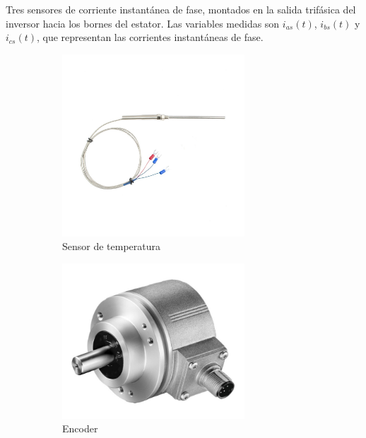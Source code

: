\documentclass{article}
\begin{document}
  
Tres sensores de corriente instantánea de fase, montados en la salida trifásica del inversor hacia los 
bornes del estator. Las variables medidas son $i_{as}(t)$, $i_{bs}(t)$ y $i_{cs}(t)$, que representan las corrientes 
instantáneas de fase.

\begin{figure}[ht]
    \centering
    \begin{subfigure}[b]{0.3\textwidth}
      \centering
      \includegraphics[width=0.75\textwidth]{Alan6.jpg}
      \caption{Sensor de temperatura}
    \end{subfigure}
    \begin{subfigure}[b]{0.3\textwidth}
      \centering
      \includegraphics[width=0.75\textwidth]{Alan5.jpg}
      \caption{Encoder}
    \end{subfigure}
    \begin{subfigure}[b]{0.3\textwidth}

\end{subfigure}
\end{figure}
\end{document}
